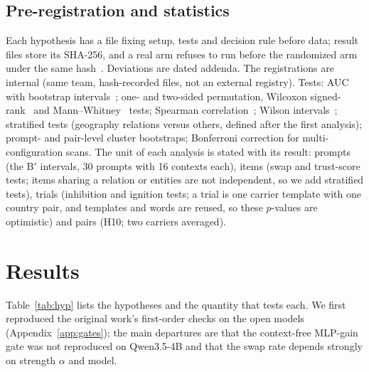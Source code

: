 \documentclass[10pt]{article}
\begin{document}
\subsection{Pre-registration and statistics}
Each hypothesis has a file fixing setup, tests and decision rule before data; result files store its SHA-256, and a real arm refuses to run before the randomized arm under the same hash~\citep{nosek2018preregistration}. Deviations are dated addenda. The registrations are internal (same team, hash-recorded files, not an external registry). Tests: AUC with bootstrap intervals~\citep{efron1979bootstrap}; one- and two-sided permutation, Wilcoxon signed-rank~\citep{wilcoxon1945individual} and Mann--Whitney~\citep{mann1947test} tests; Spearman correlation~\citep{spearman1904proof}; Wilson intervals~\citep{wilson1927probable}; stratified tests (geography relations versus others, defined after the first analysis); prompt- and pair-level cluster bootstraps; Bonferroni correction for multi-configuration scans. The unit of each analysis is stated with its result: prompts (the B$'$ intervals, 30 prompts with 16 contexts each), items (swap and trust-score tests; items sharing a relation or entities are not independent, so we add stratified tests), trials (inhibition and ignition tests; a trial is one carrier template with one country pair, and templates and words are reused, so these $p$-values are optimistic) and pairs (H10; two carriers averaged).

\section{Results}
Table~\ref{tab:hyp} lists the hypotheses and the quantity that tests each. We first reproduced the original work's first-order checks on the open models (Appendix~\ref{app:gates}); the main departures are that the context-free MLP-gain gate was not reproduced on Qwen3.5-4B and that the swap rate depends strongly on strength $\alpha$ and model.
\end{document}
